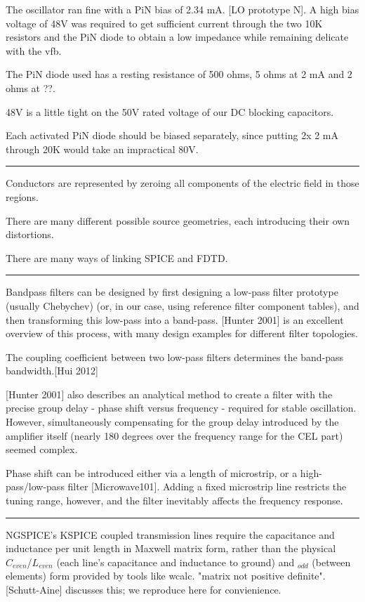 \documentclass[fleqn,10pt]{article}
\begin{document}
The oscillator ran fine with a PiN bias of 2.34 mA. [LO prototype N]. A high bias voltage of 48V was required to get sufficient current through the two 10K resistors and the PiN diode to obtain a low impedance while remaining delicate with the vfb.

The PiN diode used has a resting resistance of 500 ohms, 5 ohms at 2 mA and 2 ohms at ??. 

48V is a little tight on the 50V rated voltage of our DC blocking capacitors.

Each activated PiN diode should be biased separately, since putting 2x 2 mA through 20K would take an impractical 80V.

\rule{\linewidth}{0.2pt}

Conductors are represented by zeroing all components of the electric field in those regions. 

There are many different possible source geometries, each introducing their own distortions.

There are many ways of linking SPICE and FDTD. 

\rule{\linewidth}{0.2pt}

Bandpass filters can be designed by first designing a low-pass filter prototype (usually Chebychev) (or, in our case, using reference filter component tables), and then transforming this low-pass into a band-pass. [Hunter 2001] is an excellent overview of this process, with many design examples for different filter topologies. 

The coupling coefficient between two low-pass filters determines the band-pass bandwidth.[Hui 2012]

[Hunter 2001] also describes an analytical method to create a filter with the precise group delay - phase shift versus frequency - required for stable oscillation. However, simultaneously compensating for the group delay introduced by the amplifier itself (nearly 180 degrees over the frequency range for the CEL part) seemed complex.

Phase shift can be introduced either via a length of microstrip, or a high-pass/low-pass filter [Microwave101]. Adding a fixed microstrip line restricts the tuning range, however, and the filter inevitably affects the frequency response.  

\rule{\linewidth}{0.2pt}

NGSPICE's KSPICE coupled transmission lines require the capacitance and inductance per unit length in Maxwell matrix form, rather than the physical $C_{even}$/$L_{even}$ (each line's capacitance and inductance to ground) and $_{odd}$ (between elements) form provided by tools like wcalc. "matrix not positive definite". [Schutt-Aine] discusses this; we reproduce here for convienience.
\end{document}
